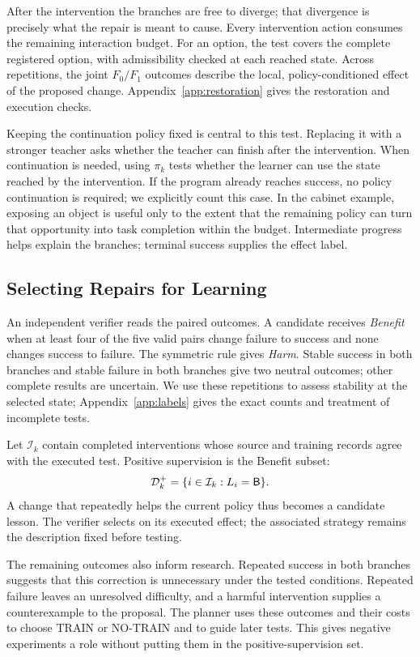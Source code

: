 After the intervention the branches are free to diverge; that divergence
is precisely what the repair is meant to cause. Every intervention action
consumes the remaining interaction budget. For an option, the test covers
the complete registered option, with admissibility checked at each reached
state. Across repetitions, the joint $F_0/F_1$ outcomes describe the local,
policy-conditioned effect of the proposed change. Appendix~\ref{app:restoration}
gives the restoration and execution checks.

Keeping the continuation policy fixed is central to this test. Replacing it
with a stronger teacher asks whether the teacher can finish after the
intervention. When continuation is needed, using $\pi_k$ tests whether the learner can
use the state reached by the intervention. If the program already reaches
success, no policy continuation is required; we explicitly count this case. In the cabinet
example, exposing an object is useful only to the extent that the remaining
policy can turn that opportunity into task completion within the budget.
Intermediate progress helps explain the branches; terminal success supplies
the effect label.

\subsection{Selecting Repairs for Learning}
\label{sec:eligibility}
An independent verifier reads the paired outcomes. A candidate receives
\emph{Benefit} when at least four of the five valid pairs change failure to
success and none changes success to failure. The symmetric rule gives
\emph{Harm}. Stable success in both branches and stable failure in both
branches give two neutral outcomes; other complete results are uncertain.
We use these repetitions to assess stability at the selected state;
Appendix~\ref{app:labels} gives the exact counts and treatment of incomplete tests.

Let $\mathcal I_k$ contain completed interventions whose source and training
records agree with the executed test. Positive supervision is the Benefit subset:
\begin{equation}
\mathcal D_k^+=\{i\in\mathcal I_k:L_i=\mathsf{B}\}.
\label{eq:eligibility}
\end{equation}
A change that repeatedly helps the current policy thus becomes a candidate
lesson. The verifier selects on its executed effect; the associated strategy
remains the description fixed before testing.

The remaining outcomes also inform research. Repeated success in both
branches suggests that this correction is unnecessary under the tested
conditions. Repeated failure leaves an unresolved difficulty, and a harmful
intervention supplies a counterexample to the proposal. The planner uses
these outcomes and their costs to choose TRAIN or NO-TRAIN and to guide
later tests. This gives negative experiments a role without putting them
in the positive-supervision set.


